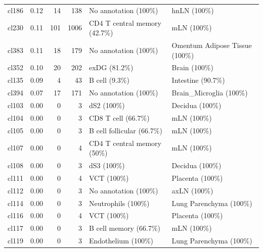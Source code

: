 \begin{table}[ht!]
\begin{tabular}{lrrrll}
  cl186 & 0.12 &  14 & 138 & No annotation (100\%) & hnLN (100\%) \\ 
  cl230 & 0.11 & 101 & 1006 & CD4 T central memory (42.7\%) & mLN (100\%) \\ 
  cl383 & 0.11 &  18 & 179 & No annotation (100\%) & Omentum Adipose Tissue (100\%) \\ 
  cl352 & 0.10 &  20 & 202 & exDG (81.2\%) & Brain (100\%) \\ 
  cl135 & 0.09 &   4 &  43 & B cell (9.3\%) & Intestine (90.7\%) \\ 
  cl394 & 0.07 &  17 & 171 & No annotation (100\%) & Brain\_Microglia (100\%) \\ 
  cl103 & 0.00 &   0 &   3 & dS2 (100\%) & Decidua (100\%) \\ 
  cl104 & 0.00 &   0 &   3 & CD8 T cell (66.7\%) & mLN (100\%) \\ 
  cl105 & 0.00 &   0 &   3 & B cell follicular (66.7\%) & mLN (100\%) \\ 
  cl107 & 0.00 &   0 &   4 & CD4 T central memory (50\%) & mLN (100\%) \\ 
  cl108 & 0.00 &   0 &   3 & dS3 (100\%) & Decidua (100\%) \\ 
  cl111 & 0.00 &   0 &   4 & VCT (100\%) & Placenta (100\%) \\ 
  cl112 & 0.00 &   0 &   3 & No annotation (100\%) & axLN (100\%) \\ 
  cl114 & 0.00 &   0 &   3 & Neutrophils (100\%) & Lung Parenchyma (100\%) \\ 
  cl116 & 0.00 &   0 &   4 & VCT (100\%) & Placenta (100\%) \\ 
  cl117 & 0.00 &   0 &   3 & B cell memory (66.7\%) & mLN (100\%) \\ 
  cl119 & 0.00 &   0 &   3 & Endothelium (100\%) & Lung Parenchyma (100\%) \\ 
   \bottomrule
\end{tabular}
\end{table}


